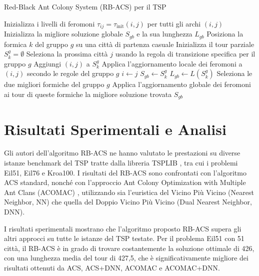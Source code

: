 \begin{algorithm}
	\caption{Red-Black Ant Colony System (\gls{RB-ACS}) per il \gls{TSP}}
	\begin{algorithmic}[1]
		\State Inizializza i livelli di feromoni $\tau_{ij} = \tau_{\text{init}}(i,j)$ per tutti gli archi $(i,j)$
		\State Inizializza la migliore soluzione globale $S_{gb}$ e la sua lunghezza $L_{gb}$
		\State Posiziona la formica $k$ del gruppo $g$ su una città di partenza casuale
		\State Inizializza il tour parziale $S_k^g = \emptyset$
		\Repeat
		\State Seleziona la prossima città $j$ usando la regola di transizione specifica per il gruppo $g$
		\State Aggiungi $(i,j)$ a $S_k^g$
		\State Applica l'aggiornamento locale dei feromoni a $(i,j)$ secondo le regole del gruppo $g$
		\State $i \gets j$
		\State $S_{gb} \gets S_k^g$
		\State $L_{gb} \gets L(S_k^g)$
		\EndIf
		\EndFor
		\EndFor
		\State Seleziona le due migliori formiche del gruppo $g$
		\State Applica l'aggiornamento globale dei feromoni ai tour di queste formiche
		\EndFor
		\EndFor
		\State \Return la migliore soluzione trovata $S_{gb}$
	\end{algorithmic}
\end{algorithm}



\section{Risultati Sperimentali e Analisi}
Gli autori dell'algoritmo \gls{RB-ACS} ne hanno valutato le prestazioni su diverse istanze benchmark del \gls{TSP} tratte dalla libreria \gls{TSP}LIB \cite{TSPLIB}, tra cui i problemi Eil51, Eil76 e Kroa100. I risultati del \gls{RB-ACS} sono confrontati con l'algoritmo  \gls{ACS} standard, nonché con l'approccio Ant Colony Optimization with Multiple Ant Clans (\gls{ACOMAC}) \cite{Tsai2002}, utilizzando sia l'euristica del Vicino Più Vicino (Nearest Neighbor, NN) che quella del Doppio Vicino Più Vicino (Dual Nearest Neighbor, \gls{DNN}).

I risultati sperimentali mostrano che l'algoritmo proposto \gls{RB-ACS} supera gli altri approcci su tutte le istanze del \gls{TSP} testate. Per il problema Eil51 con 51 città, il \gls{RB-ACS} è in grado di trovare costantemente la soluzione ottimale di 426, con una lunghezza media del tour di 427,5, che è significativamente migliore dei risultati ottenuti da  \gls{ACS},  \gls{ACS}+\gls{DNN}, \gls{ACOMAC} e \gls{ACOMAC}+\gls{DNN}.

